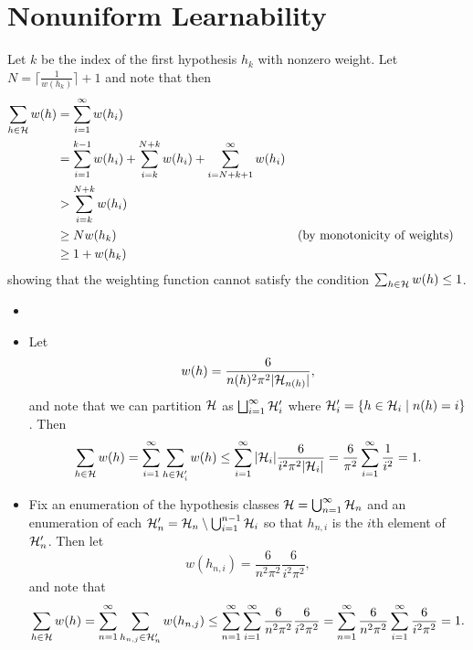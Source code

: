 \chapter{Nonuniform Learnability}

\begin{ex}
\end{ex}

\begin{ex}
  Let $k$ be the index of the first hypothesis $h_k$ with nonzero weight. Let
  $N=\lceil \frac{1}{w(h_k)} \rceil +1$ and note that then
  \begin{align*}
    \sum_{h\in\mathcal{H}} w(h)
     & =\sum_{i=1}^\infty w(h_i)                                                               \\
     & =\sum_{i=1}^{k-1} w(h_i) +\sum_{i=k}^{N+k} w(h_i)
    +\sum_{i=N+k+1}^\infty w(h_i)                                                              \\
     & > \sum_{i=k}^{N+k} w(h_i)                                                               \\
     & \geq N w(h_k)
     &                                                   & \text{(by monotonicity of weights)} \\
     & \geq 1 + w(h_k)
  \end{align*}
  showing that the weighting function cannot satisfy the condition
  $\sum_{h\in\mathcal{H}}w(h)\leq 1$.
\end{ex}

\begin{ex}
  \begin{itemize}
    \item[]
    \item Let
          \[
            w(h)=\frac{6}{n(h)^2\pi^2|\mathcal{H}_{n(h)}|},
          \]
          and note that we can partition $\mathcal{H}$ as
          $\bigsqcup_{i=1}^\infty \mathcal{H}'_i$
          where $\mathcal{H}'_i=\{h\in \mathcal{H}_i \mid n(h) = i\}$. Then
          \begin{align*}
            \sum_{h\in\mathcal{H}} w(h)
            = \sum_{i=1}^\infty\sum_{h\in \mathcal{H}'_i} w(h)
            \leq \sum_{i=1}^\infty |\mathcal{H}_i| \frac{6}{i^2 \pi^2 |\mathcal{H}_i|}
            =\frac{6}{\pi^2}\sum_{i=1}^\infty \frac{1}{i^2} = 1.
          \end{align*}
    \item Fix an enumeration of the hypothesis classes
          $\mathcal{H}=\bigcup_{n=1}^\infty\mathcal{H}_n$ and an enumeration of each
          $\mathcal{H}_n'=\mathcal{H}_n\setminus \bigcup_{i=1}^{n-1}\mathcal{H}_i$ so that $h_{n,i}$ is the
          $i$th element of $\mathcal{H}_n'$. Then let
          \[
            w(h_{n,i})=\frac{6}{n^2\pi^2}\frac{6}{i^2\pi^2},
          \]
          and note that
          \begin{align*}
            \sum_{h\in\mathcal{H}} w(h)
            = \sum_{n=1}^\infty\sum_{h_{n,j}\in \mathcal{H}'_n} w(h_{n,j})
            \leq \sum_{n=1}^\infty\sum_{i=1}^\infty
            \frac{6}{n^2 \pi^2} \frac{6}{i^2 \pi^2}
            =\sum_{n=1}^\infty \frac{6}{n^2 \pi^2}
            \sum_{i=1}^\infty \frac{6}{i^2 \pi^2}
            =1.
          \end{align*}
  \end{itemize}
\end{ex}

\begin{ex}
\end{ex}

\begin{ex}
\end{ex}

\begin{ex}
\end{ex}